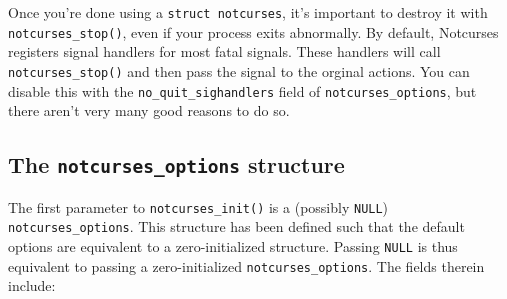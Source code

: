\documentclass[letterpaper,10pt]{article}
\begin{document}
Once you're done using a \texttt{struct notcurses}, it's important to destroy
it with \texttt{notcurses\_stop()}, even if your process exits abnormally. By
default, Notcurses registers signal handlers for most fatal signals. These
handlers will call \texttt{notcurses\_stop()} and then pass the signal to the
orginal actions. You can disable this with the \texttt{no\_quit\_sighandlers}
field of \texttt{notcurses\_options}, but there aren't very many good reasons
to do so.

\subsection{The \texttt{notcurses\_options} structure}
The first parameter to \texttt{notcurses\_init()} is a (possibly \texttt{NULL})
\texttt{notcurses\_options}. This structure has been defined such that the
default options are equivalent to a zero-initialized structure. Passing \texttt{NULL}
is thus equivalent to passing a zero-initialized \texttt{notcurses\_options}.
The fields therein include:
\end{document}
